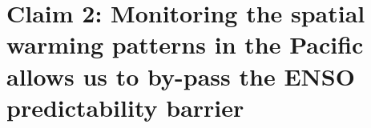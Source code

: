 \section{Claim 2: Monitoring the spatial warming patterns in the Pacific allows us to by-pass the ENSO predictability barrier}